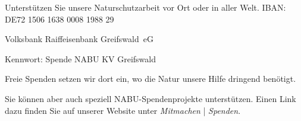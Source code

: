 \newpage
{}

Unterstützen Sie unsere Naturschutzarbeit vor Ort oder in aller Welt.
\vfill
IBAN: DE72 1506 1638 0008 1988 29 

Volksbank Raiffeisenbank 
Greifswald~eG

Kennwort: Spende NABU KV Greifswald

Freie Spenden setzen wir dort ein, wo die Natur unsere Hilfe dringend benötigt. 

Sie können aber auch speziell NABU-Spendenprojekte unterstützen. Einen Link dazu finden Sie auf unserer Website 
unter \textit{Mitmachen} | \textit{Spenden}.
